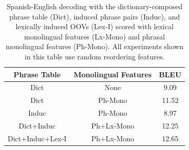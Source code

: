 \documentclass[11pt]{article}
\begin{document}



\begin{table}
\small
\begin{center}
\begin{tabular}{|c|c|c|}
\hline
Phrase Table & Monolingual Features & BLEU \\ %
\hline
Dict & None & 9.09 \\
Dict & Ph-Mono & 11.52 \\
Induc & Ph-Mono &  8.97 \\
Dict+Induc & Ph+Lx-Mono & 12.25 \\
Dict+Induc+Lex-I & Ph+Lx-Mono & 12.65 \\
\hline
\end{tabular}
\caption{Spanish-English decoding with the dictionary-composed phrase table (Dict), induced phrase pairs (Induc), and lexically induced OOVs (Lex-I) scored with lexical monolingual features (Lx-Mono) and phrasal monolingual features (Ph-Mono). All experiments shown in this table use random reordering features.}\label{table:new-phrase-tables}
\end{center}
\end{table}
\end{document}
